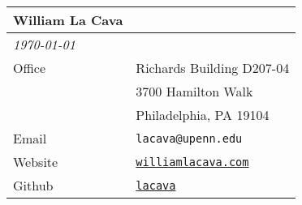 \noindent \begin{tabularx}{\textwidth}{ll}
{\large \bf William La Cava} \\ \hline
{\it \today} \\
Office & Richards Building D207-04 \\
&3700 Hamilton Walk \\ 
&Philadelphia, PA 19104 \\ 
Email & \texttt{lacava@upenn.edu} \\
Website & \href{http://williamlacava.com}{\texttt{williamlacava.com}} \\ 
Github  &   \href{http://github.com/lacava}{\texttt{lacava}}

\end{tabularx}
